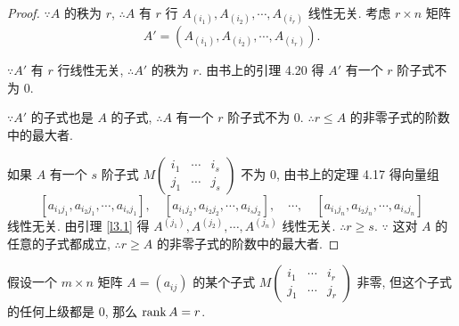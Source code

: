 \documentclass[color=black,device=normal,lang=cn,mode=geye]{elegantnote}
\begin{document}
\begin{proof}
    $\because A$ 的秩为 $r$, $\therefore A$ 有 $r$ 行 $A_{(i_1)},A_{(i_2)},\cdots,A_{(i_r)}$ 线性无关. 考虑 $r\times n$ 矩阵
    \[A'=(A_{(i_1)},A_{(i_2)},\cdots,A_{(i_r)}).\]

    $\because A'$ 有 $r$ 行线性无关, $\therefore A'$ 的秩为 $r$. 由书上的引理 4.20 得 $A'$ 有一个 $r$ 阶子式不为 $0$.
    
    $\because A'$ 的子式也是 $A$ 的子式, $\therefore A$ 有一个 $r$ 阶子式不为 $0$. $\therefore r\leq A$ 的非零子式的阶数中的最大者.

    如果 $A$ 有一个 $s$ 阶子式 $M\begin{pmatrix} i_1 & \cdots & i_s \\ j_1 & \cdots & j_s \end{pmatrix}$ 不为 $0$, 由书上的定理 4.17 得向量组
    \[[a_{i_1j_1},a_{i_2j_1},\cdots,a_{i_sj_1}],\quad[a_{i_1j_2},a_{i_2j_2},\cdots,a_{i_sj_2}],\quad\cdots,\quad[a_{i_1j_n},a_{i_2j_n},\cdots,a_{i_sj_n}]\]
    线性无关. 由引理 \ref{l3.1} 得 $A^{(j_1)},A^{(j_2)},\cdots,A^{(j_n)}$ 线性无关. $\therefore r\geq s$. $\because$ 这对 $A$ 的任意的子式都成立, $\therefore r\geq A$ 的非零子式的阶数中的最大者.
\end{proof}
\begin{theorem}[书上的命题 4.22]
    假设一个 $m\times n$ 矩阵 $A=(a_{ij})$ 的某个子式 $M\begin{pmatrix} i_1 & \cdots & i_r \\ j_1 & \cdots & j_r \end{pmatrix}$ 非零, 但这个子式的任何上级都是 $0$, 那么 $\operatorname{rank} A=r$.
\end{theorem}
\end{document}
